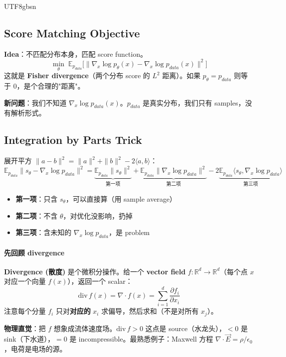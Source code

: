 \documentclass[11pt]{article}
\begin{document}
\begin{CJK}{UTF8}{gbsn}
\subsection{Score Matching Objective}

\textbf{Idea}：不匹配分布本身，匹配 score function。
\[
  \min_\theta \;\mathbb{E}_{p_{data}}\!\big[\|\nabla_x \log p_\theta(x) - \nabla_x \log p_{data}(x)\|^2\big]
\]
这就是 \textbf{Fisher divergence}（两个分布 score 的 $L^2$ 距离）。如果 $p_\theta = p_{data}$ 则等于 $0$，是个合理的"距离"。

\textbf{新问题}：我们不知道 $\nabla_x \log p_{data}(x)$。$p_{data}$ 是真实分布，我们只有 samples，没有解析形式。

\subsection{Integration by Parts Trick}

展开平方 $\|a - b\|^2 = \|a\|^2 + \|b\|^2 - 2\langle a, b \rangle$：
\[
\mathbb{E}_{p_{data}} \|s_\theta - \nabla_x \log p_{data}\|^2 = \underbrace{\mathbb{E}_{p_{data}} \|s_\theta\|^2}_{\text{第一项}} + \underbrace{\mathbb{E}_{p_{data}} \|\nabla_x \log p_{data}\|^2}_{\text{第二项}} - 2\underbrace{\mathbb{E}_{p_{data}}\langle s_\theta, \nabla_x \log p_{data}\rangle}_{\text{第三项}}
\]
\begin{itemize}[nosep]
  \item \textbf{第一项}：只含 $s_\theta$，可以直接算（用 sample average）
  \item \textbf{第二项}：不含 $\theta$，对优化没影响，扔掉
  \item \textbf{第三项}：含未知的 $\nabla_x \log p_{data}$，是 problem
\end{itemize}

\paragraph{先回顾 divergence}

\textbf{Divergence (散度)} 是个微积分操作。给一个 \textbf{vector field} $f: \mathbb{R}^d \to \mathbb{R}^d$（每个点 $x$ 对应一个向量 $f(x)$），返回一个 scalar：
\[
\text{div}\, f(x) = \nabla \cdot f(x) = \sum_{i=1}^d \frac{\partial f_i}{\partial x_i}
\]
注意每个分量 $f_i$ 只对\textbf{对应的} $x_i$ 求偏导，然后求和（不是对所有 $x_j$）。

\textbf{物理直觉}：把 $f$ 想象成流体速度场。$\text{div}\, f > 0$ 这点是 source（水龙头），$< 0$ 是 sink（下水道），$= 0$ 是 incompressible。最熟悉例子：Maxwell 方程 $\nabla \cdot \vec{E} = \rho/\epsilon_0$，电荷是电场的源。


\end{CJK}
\end{document}
